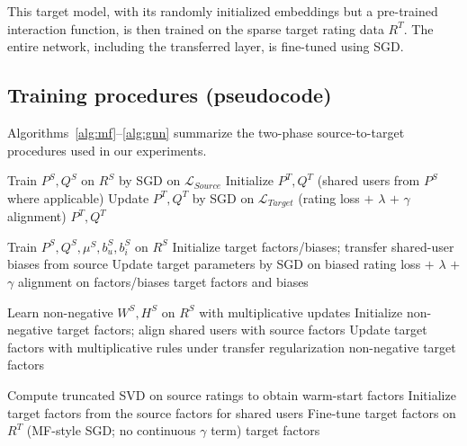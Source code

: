 \documentclass[pdflatex,sn-mathphys-num]{sn-jnl}%
\theoremstyle{thmstyleone}%
\theoremstyle{thmstyletwo}%
\theoremstyle{thmstylethree}%
\begin{document}
This target model, with its randomly initialized embeddings but a pre-trained interaction function, is then trained on the sparse target rating data $R^T$. The entire network, including the transferred layer, is fine-tuned using SGD.

\subsection{Training procedures (pseudocode)}
Algorithms~\ref{alg:mf}--\ref{alg:gnn} summarize the two-phase source-to-target procedures used in our experiments.

\begin{algorithm}[htbp]
\caption{Training procedure of MF\_CDRS.}
\label{alg:mf}
\begin{algorithmic}[1]
\State Train $P^S,Q^S$ on $R^S$ by SGD on $\mathcal{L}_{Source}$
\State Initialize $P^T,Q^T$ (shared users from $P^S$ where applicable)
\State Update $P^T,Q^T$ by SGD on $\mathcal{L}_{Target}$ (rating loss $+$ $\lambda$ $+$ $\gamma$ alignment)
\EndFor
\State \Return $P^T,Q^T$
\end{algorithmic}
\end{algorithm}

\begin{algorithm}[htbp]
\caption{Training procedure of MFB\_CDRS.}
\label{alg:mfb}
\begin{algorithmic}[1]
\State Train $P^S,Q^S,\mu^S,b_u^S,b_i^S$ on $R^S$
\State Initialize target factors/biases; transfer shared-user biases from source
\State Update target parameters by SGD on biased rating loss $+$ $\lambda$ $+$ $\gamma$ alignment on factors/biases
\EndFor
\State \Return target factors and biases
\end{algorithmic}
\end{algorithm}

\begin{algorithm}[htbp]
\caption{Training procedure of NMF\_CDRS.}
\label{alg:nmf}
\begin{algorithmic}[1]
\State Learn non-negative $W^S,H^S$ on $R^S$ with multiplicative updates
\State Initialize non-negative target factors; align shared users with source factors
\State Update target factors with multiplicative rules under transfer regularization
\EndFor
\State \Return non-negative target factors
\end{algorithmic}
\end{algorithm}

\begin{algorithm}[htbp]
\caption{Training procedure of SVD\_CDRS.}
\label{alg:svd}
\begin{algorithmic}[1]
\State Compute truncated SVD on source ratings to obtain warm-start factors
\State Initialize target factors from the source factors for shared users
\State Fine-tune target factors on $R^T$ (MF-style SGD; no continuous $\gamma$ term)
\EndFor
\State \Return target factors
\end{algorithmic}
\end{algorithm}
\end{document}
